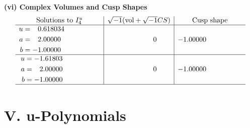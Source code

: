 \documentclass[1p]{elsarticle_modified}
\theoremstyle{definition}
\newcommand{\I}{\sqrt{-1}}
\begin{document}
\newpage\flushleft \textbf{(vi) Complex Volumes and Cusp Shapes}
$$\begin{array}{c|c|c}  
\text{Solutions to }I^u_{4}& \I (\text{vol} + \sqrt{-1}CS) & \text{Cusp shape}\\
 \hline 
\begin{aligned}
u &= \phantom{-}0.618034\phantom{ +0.000000I} \\
a &= \phantom{-}2.00000\phantom{ +0.000000I} \\
b &= -1.00000\phantom{ +0.000000I}\end{aligned}
 & \phantom{-0.000000 } 0 & -1.00000\phantom{ +0.000000I} \\ \hline\begin{aligned}
u &= -1.61803\phantom{ +0.000000I} \\
a &= \phantom{-}2.00000\phantom{ +0.000000I} \\
b &= -1.00000\phantom{ +0.000000I}\end{aligned}
 & \phantom{-0.000000 } 0 & -1.00000\phantom{ +0.000000I}\\
 \hline 
 \end{array}$$\newpage
\newpage\renewcommand{\arraystretch}{1}
\centering \section*{ V. u-Polynomials}
\end{document}
